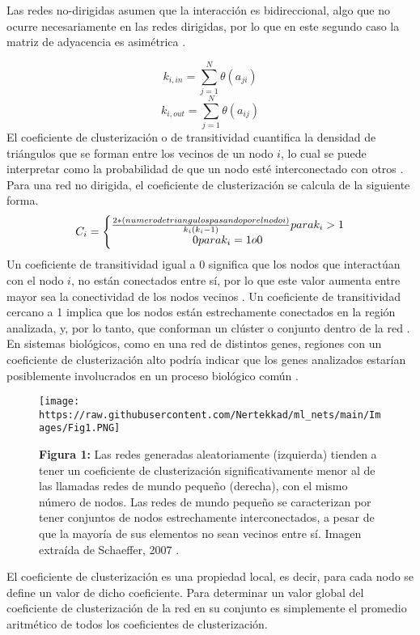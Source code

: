 \documentclass[
]{book}
\begin{document}
Las redes no-dirigidas asumen que la interacción es bidireccional, algo que no ocurre necesariamente en las redes dirigidas, por lo que en este segundo caso la matriz de adyacencia es asimétrica \citep{bianconi2018multilayer}.

\[k_{i, in}=\sum_{j=1}^{N} \theta (a_{ji})\]
\[k_{i, out}=\sum_{j=1}^{N} \theta (a_{ij})\]
El coeficiente de clusterización o de transitividad cuantifica la densidad de triángulos que se forman entre los vecinos de un nodo \(i\), lo cual se puede interpretar como la probabilidad de que un nodo esté interconectado con otros \citep{wang2017comparison}. Para una red no dirigida, el coeficiente de clusterización se calcula de la siguiente forma.
\[C_{i}=\left\{\begin{matrix}
\frac {2*(numero \space de \space triangulos \space pasando \space por \space el \space nodo \space i)}{k_{i}(k_{i}-1)} \space para \space k_{i}>1\\
0 \space para \space k_{i}=1 \space o \space 0
\end{matrix}\right.\]
Un coeficiente de transitividad igual a 0 significa que los nodos que interactúan con el nodo \(i\), no están conectados entre sí, por lo que este valor aumenta entre mayor sea la conectividad de los nodos vecinos \citep{schaeffer2007graph}. Un coeficiente de transitividad cercano a 1 implica que los nodos están estrechamente conectados en la región analizada, y, por lo tanto, que conforman un clúster o conjunto dentro de la red \citep{schaeffer2007graph}. En sistemas biológicos, como en una red de distintos genes, regiones con un coeficiente de clusterización alto podría indicar que los genes analizados estarían posiblemente involucrados en un proceso biológico común \citep{aleta2019multilayer}.

\begin{figure}
\centering
\texttt{[image: https://raw.githubusercontent.com/Nertekkad/ml\_nets/main/Images/Fig1.PNG]}
\caption{\textbf{Figura 1:} Las redes generadas aleatoriamente (izquierda) tienden a tener un coeficiente de clusterización significativamente menor al de las llamadas redes de mundo pequeño (derecha), con el mismo número de nodos. Las redes de mundo pequeño se caracterizan por tener conjuntos de nodos estrechamente interconectados, a pesar de que la mayoría de sus elementos no sean vecinos entre sí. Imagen extraída de Schaeffer, 2007 \citep{schaeffer2007graph}.}
\end{figure}

El coeficiente de clusterización es una propiedad local, es decir, para cada nodo se define un valor de dicho coeficiente. Para determinar un valor global del coeficiente de clusterización de la red en su conjunto es simplemente el promedio aritmético de todos los coeficientes de clusterización.
\end{document}
